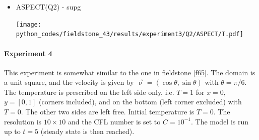 \begin{itemize}
\item ASPECT(Q2) - supg %

\begin{center}
\texttt{[image: python\_codes/fieldstone\_43/results/experiment3/Q2/ASPECT/T.pdf]}
\end{center}




\end{itemize}

\paragraph{Experiment 4}

This experiment is somewhat similar to the one in fieldstone \ref{f65}.
The domain is a unit square, and the velocity is given by $\vec\upnu=(\cos \theta, \sin\theta)$ with $\theta=\pi/6$.
The temperature is prescribed on the left side only, i.e. $T=1$ for $x=0$, $y=[0,1]$ (corners included), and 
on the bottom (left corner excluded) with $T=0$. The other two sides are left free. Initial temperature is $T=0$.
The resolution is $10\times10$ and the CFL number is set to $C=10^{-1}$. The model is run up to $t=5$ (steady 
state is then reached). 

